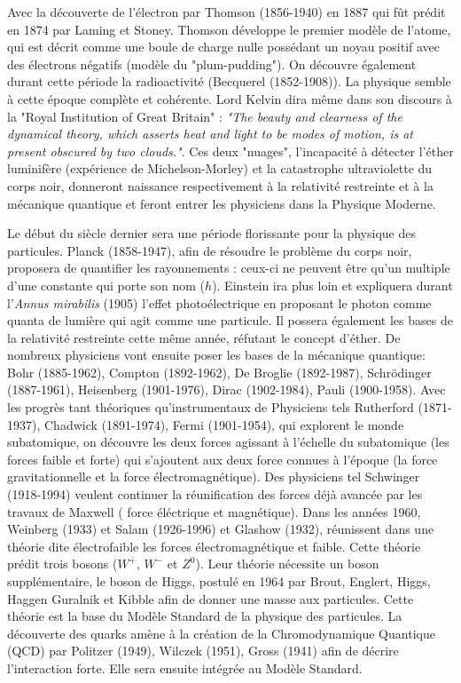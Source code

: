 Avec la découverte de l'électron par Thomson (1856-1940) en 1887 qui fût prédit en 1874 par Laming et Stoney. Thomson développe le premier modèle de l'atome, qui est décrit comme une boule de charge nulle possédant un noyau positif avec des électrons négatifs (modèle du "plum-pudding"). On découvre également durant cette période la radioactivité (Becquerel (1852-1908)). La physique semble à cette époque complète et cohérente. Lord Kelvin dira même dans son discours à la "Royal Institution of Great Britain" : \textit{"The beauty and clearness of the dynamical theory, which asserts heat and light to be modes of motion, is at present obscured by two clouds."}. Ces deux "nuages", l'incapacité à détecter l'éther luminifère  (expérience de Michelson-Morley) et la catastrophe ultraviolette du corps noir, donneront naissance respectivement à la relativité restreinte et à la mécanique quantique et feront entrer les physiciens dans la Physique Moderne.

Le début du siècle dernier sera une période florissante pour la physique des particules. Planck (1858-1947), afin de résoudre le problème du corps noir, proposera de quantifier les rayonnements : ceux-ci ne peuvent être qu'un multiple d'une constante qui porte son nom ($h$). Einstein ira plus loin et expliquera durant l'\textit{Annus mirabilis} (1905) l'effet photoélectrique en proposant le photon comme quanta de lumière qui agit comme une particule. Il possera également les bases de la relativité restreinte cette même année, réfutant le concept d'éther. De nombreux physiciens vont ensuite poser les bases de la mécanique quantique: Bohr (1885-1962), Compton (1892-1962), De Broglie (1892-1987), Schrödinger (1887-1961), Heisenberg (1901-1976), Dirac (1902-1984), Pauli (1900-1958). Avec les progrès tant théoriques qu'instrumentaux de Physiciens tels  Rutherford (1871-1937), Chadwick (1891-1974), Fermi (1901-1954), qui explorent le monde subatomique, on découvre les deux forces agissant à l'échelle du subatomique (les forces faible et forte) qui s'ajoutent aux deux force connues à l'époque (la force gravitationnelle et la force électromagnétique). Des physiciens tel Schwinger (1918-1994) veulent continuer la réunification des forces déjà avancée par les travaux de Maxwell ( force éléctrique et magnétique). Dans les années 1960, Weinberg (1933) et Salam (1926-1996) et Glashow (1932), réunissent dans une théorie dite électrofaible les forces électromagnétique et faible. Cette théorie prédit trois bosons ($W^{+}$, $W^{-}$ et $Z^{0}$). Leur théorie nécessite un boson supplémentaire, le boson de Higgs, postulé en 1964 par Brout, Englert, Higgs, Haggen Guralnik et Kibble afin de donner une masse aux particules. Cette théorie est la base du Modèle Standard de la physique des particules. La découverte des quarks amène à la création de la Chromodynamique Quantique (QCD) par Politzer (1949), Wilczek (1951), Gross (1941) afin de décrire l'interaction forte. Elle sera ensuite intégrée au Modèle Standard.

